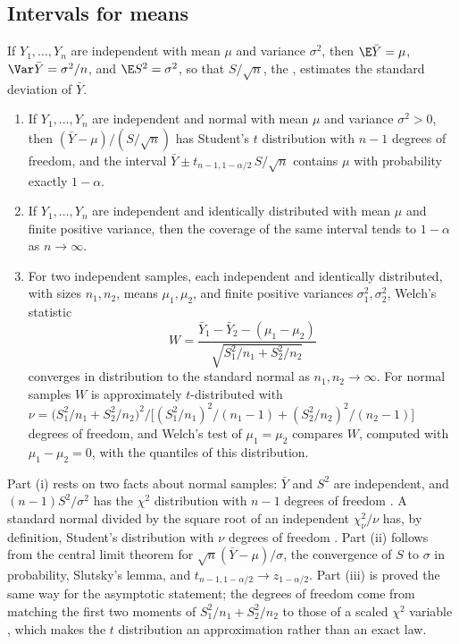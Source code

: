\begin{refsection}
\section{Intervals for means}\label{sec:toolkit:mean}

If $Y_1,\dots,Y_n$ are independent with mean $\mu$ and variance $\sigma^2$, then $\E\bar Y=\mu$, $\Var\bar Y=\sigma^2/n$, and $\E S^2=\sigma^2$, so that $S/\sqrt n$, the , estimates the standard deviation of $\bar Y$.

\begin{theorem}\label{thm:toolkit:tinterval}
\begin{enumerate}
\item If $Y_1,\dots,Y_n$ are independent and normal with mean $\mu$ and variance $\sigma^2>0$, then $(\bar Y-\mu)/(S/\sqrt n)$ has Student's $t$ distribution with $n-1$ degrees of freedom, and the interval $\bar Y\pm t_{n-1,1-\alpha/2}\,S/\sqrt n$ contains $\mu$ with probability exactly $1-\alpha$.
\item If $Y_1,\dots,Y_n$ are independent and identically distributed with mean $\mu$ and finite positive variance, then the coverage of the same interval tends to $1-\alpha$ as $n\to\infty$.
\item For two independent samples, each independent and identically distributed, with sizes $n_1,n_2$, means $\mu_1,\mu_2$, and finite positive variances $\sigma_1^2,\sigma_2^2$, Welch's statistic
\[
W=\frac{\bar Y_1-\bar Y_2-(\mu_1-\mu_2)}{\sqrt{S_1^2/n_1+S_2^2/n_2}}
\]
converges in distribution to the standard normal as $n_1,n_2\to\infty$. For normal samples $W$ is approximately $t$-distributed with
$\nu=\bigl(S_1^2/n_1+S_2^2/n_2\bigr)^2\big/\bigl[(S_1^2/n_1)^2/(n_1-1)+(S_2^2/n_2)^2/(n_2-1)\bigr]$
degrees of freedom, and Welch's test of $\mu_1=\mu_2$ compares $W$, computed with $\mu_1-\mu_2=0$, with the quantiles of this distribution.
\end{enumerate}
\end{theorem}

\begin{proofsketch}
Part (i) rests on two facts about normal samples: $\bar Y$ and $S^2$ are independent, and $(n-1)S^2/\sigma^2$ has the $\chi^2$ distribution with $n-1$ degrees of freedom \parencite[Section~5.3]{CasellaBerger2002}. A standard normal divided by the square root of an independent $\chi^2_\nu/\nu$ has, by definition, Student's distribution with $\nu$ degrees of freedom \parencite{Student1908}. Part (ii) follows from the central limit theorem for $\sqrt n(\bar Y-\mu)/\sigma$, the convergence of $S$ to $\sigma$ in probability, Slutsky's lemma, and $t_{n-1,1-\alpha/2}\to z_{1-\alpha/2}$. Part (iii) is proved the same way for the asymptotic statement; the degrees of freedom come from matching the first two moments of $S_1^2/n_1+S_2^2/n_2$ to those of a scaled $\chi^2$ variable \parencite{Satterthwaite1946,Welch1947}, which makes the $t$ distribution an approximation rather than an exact law.
\end{proofsketch}


\end{refsection}
